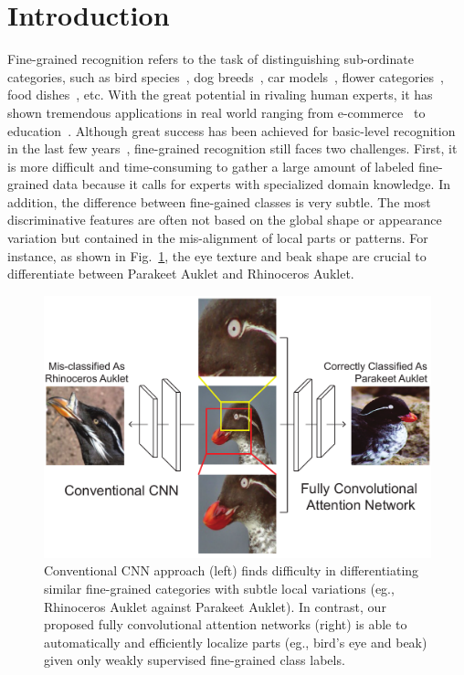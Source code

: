 \documentclass[10pt,twocolumn,letterpaper]{article}
\begin{document}
\section{Introduction}
Fine-grained recognition refers to the task of distinguishing sub-ordinate categories, such as bird species~\cite{wah2011caltech}, dog breeds~\cite{khosla2011novel}, car models~\cite{krause20133d}, flower categories~\cite{nilsback2008automated}, food dishes~\cite{bossard2014food}, etc.
With the great potential in rivaling human experts, it has shown tremendous applications in real world ranging from e-commerce~\cite{bell2015learning, hadi2015buy} to education~\cite{kumar2012leafsnap, berg2014birdsnap}.
Although great success has been achieved for basic-level recognition in the last few years~\cite{krizhevsky2012imagenet, simonyan2014very, szegedy2015going, he2016deep}, fine-grained recognition still faces two challenges.
First, it is more difficult and time-consuming to gather a large amount of labeled fine-grained data because it calls for experts with specialized domain knowledge.
In addition, the difference between fine-gained classes is very subtle.
The most discriminative features are often not based on the global shape or appearance variation but contained in the mis-alignment of local parts or patterns.
For instance, as shown in Fig.~\ref{fig:teaser}, the eye texture and beak shape are crucial to differentiate between Parakeet Auklet and Rhinoceros Auklet.

\begin{figure}
\begin{center}
\includegraphics[width=.5\textwidth]{figs/teaser_v2.pdf}
\end{center}
\caption{Conventional CNN approach (left) finds difficulty in differentiating similar fine-grained categories with subtle local variations (eg., Rhinoceros Auklet against Parakeet Auklet).
In contrast, our proposed fully convolutional attention networks (right) is able to automatically and efficiently localize parts (eg., bird's eye and beak) given only weakly supervised fine-grained class labels.
}
\label{fig:teaser}
\end{figure}
\end{document}
